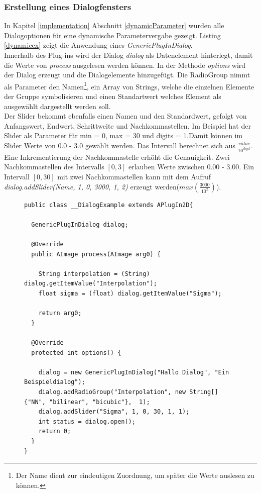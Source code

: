 \subsubsection{Erstellung eines Dialogfensters}
In Kapitel \ref{implementation} Abschnitt \ref{dynamicParameter} wurden alle Dialogoptionen für eine dynamische Parametervergabe gezeigt. Listing \ref{dynamicex} zeigt die Anwendung eines \textit{GenericPlugInDialog}.\\
Innerhalb des Plug-ins wird der Dialog \textit{dialog} als Datenelement hinterlegt, damit die Werte von \textit{process} ausgelesen werden können. In der Methode \textit{options} wird der Dialog erzeugt und die Dialogelemente hinzugefügt. Die RadioGroup nimmt als Parameter den Namen\footnote{Der Name dient zur eindeutigen Zuordnung, um später die Werte auslesen zu können.}, ein Array von Strings, welche die einzelnen Elemente der Gruppe symbolisieren und einen Standartwert welches Element als ausgewählt dargestellt werden soll.\\
Der Slider bekommt ebenfalls einen Namen und den Standardwert, gefolgt von Anfangswert, Endwert, Schrittweite und Nachkommastellen. Im Beispiel hat der Slider als Parameter für min = 0, max = 30 und digits = 1.Damit können im Slider Werte von $0.0$ - $3.0$ gewählt werden. Das Intervall berechnet sich aus $\frac{value}{10^{digit}}$. Eine Inkrementierung der Nachkommastelle erhöht die Genauigkeit. Zwei Nachkommastellen des Intervalls $[0,3]$ erlauben Werte zwischen $0.00$ - $3.00$. Ein Intervall $[0,30]$ mit zwei Nachkommastellen kann mit dem Aufruf \textit{dialog.addSlider(\glqq Name\grqq, 1, 0, 3000, 1, 2)} erzeugt werden($max(\frac{3000}{10^2})$).

\begin{figure}[htbp]
\begin{lstlisting}[frame=leftline]
public class __DialogExample extends APlugIn2D{

  GenericPlugInDialog dialog;
	
  @Override
  public AImage process(AImage arg0) {

    String interpolation = (String) dialog.getItemValue("Interpolation");
    float sigma = (float) dialog.getItemValue("Sigma");
	    
    return arg0;	
  }
 
  @Override
  protected int options() {
		
    dialog = new GenericPlugInDialog("Hallo Dialog", "Ein Beispieldialog");	
    dialog.addRadioGroup("Interpolation", new String[]{"NN", "bilinear", "bicubic"},  1);
    dialog.addSlider("Sigma", 1, 0, 30, 1, 1);
    int status = dialog.open();	
    return 0;
  }
}
\end{lstlisting}
\end{figure}

